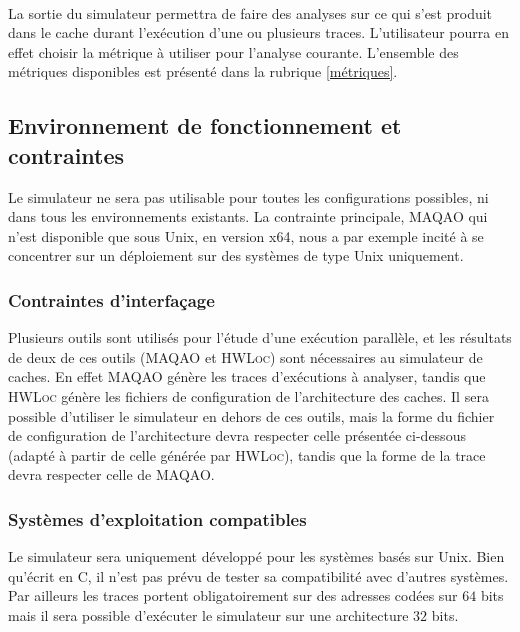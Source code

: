 \paragraph{}
La sortie du simulateur permettra de faire des analyses sur ce qui s'est produit dans le cache durant l'exécution d'une ou plusieurs traces. L'utilisateur pourra en effet choisir la métrique à utiliser pour l'analyse courante. L'ensemble des métriques disponibles est présenté dans la rubrique \ref{métriques}. 

\subsection{Environnement de fonctionnement et contraintes}

Le simulateur ne sera pas utilisable pour toutes les configurations possibles, ni dans tous les environnements existants. La contrainte principale, \textsc{MAQAO} qui n'est disponible que sous Unix, en version x64, nous a par exemple incité à se concentrer sur un déploiement sur des systèmes de type Unix uniquement. 

\subsubsection{Contraintes d'interfaçage}

Plusieurs outils sont utilisés pour l'étude d'une exécution parallèle, et les résultats de deux de ces outils (\textsc{MAQAO} et \textsc{HWLoc}) sont nécessaires au simulateur de caches. En effet \textsc{MAQAO} génère les traces d'exécutions à analyser, tandis que \textsc{HWLoc}
génère les fichiers de configuration de l'architecture des caches. Il sera possible d'utiliser le simulateur en dehors de ces outils, mais la forme du fichier de configuration de l'architecture devra respecter celle présentée ci-dessous (adapté à partir de celle générée par \textsc{HWLoc}), tandis que la forme de la trace devra respecter celle de \textsc{MAQAO}.

\subsubsection{Systèmes d'exploitation compatibles}

Le simulateur sera uniquement développé pour les systèmes basés sur Unix. Bien qu'écrit en \textsc{C}, il n'est pas prévu de tester sa compatibilité avec d'autres systèmes. Par ailleurs les traces portent obligatoirement sur des adresses codées sur $64$ bits mais il sera possible d'exécuter le simulateur sur une architecture $32$ bits.

